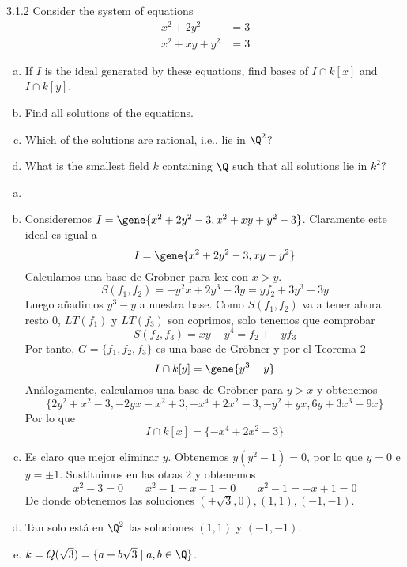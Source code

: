 \documentclass[twoside]{article}
\begin{document}
\begin{ejercicio}{3.1.2}
Consider the system of equations
\begin{align*}
x^2+2y^2&=3\\
x^2+xy+y^2&=3
\end{align*}
\begin{enumerate}[a.]
\item If $I$ is the ideal generated by these equations, find bases of $I ∩ k[x]$ and $I ∩ k[y]$.
\item Find all solutions of the equations.
\item Which of the solutions are rational, i.e., lie in $\Q^2$?
\item What is the smallest field $k$ containing $\Q$ such that all solutions lie in $k^2$?
\end{enumerate}
\end{ejercicio}
\begin{solucion}
\begin{enumerate}[a.]
\item[]
\item Consideremos $I=\gene{x^2+2y^2-3,x^2+xy+y^2-3}$. Claramente este ideal es igual a
$$
I=\gene{x^2+2y^2-3,xy-y^2}
$$
Calculamos una base de Gröbner para lex con $x>y$.
$$
S(f_1,f_2) = -y^2x + 2y^3-3y   = yf_2 + 3y^3-3y 
$$
Luego añadimos $y^3-y$ a nuestra base. Como $S(f_1,f_2)$ va a tener ahora resto 0, $LT(f_1)$ y $LT(f_3)$ son coprimos, solo tenemos que comprobar
$$
S(f_2,f_3) = xy - y^4 = f_2 + -yf_3
$$
Por tanto, $G=\{f_1,f_2,f_3\}$ es una base de Gröbner y por el Teorema 2 
$$I\cap k[y] = \gene{y^3-y}$$
Análogamente, calculamos una base de Gröbner para $y>x$ y obtenemos
$$
\{2y^2 + x^2 - 3, -2yx - x^2 + 3, -x^4 + 2x^2 - 3, -y^2 + yx, 6y +3x^3 - 9x\}
$$
Por lo que 
$$
I\cap k[x] = \{-x^4+2x^2-3\}
$$
\item Es claro que mejor eliminar $y$. Obtenemos $y(y^2-1)=0$, por lo que $y=0$ e $y=\pm 1$. Sustituimos en las otras 2 y obtenemos
$$
x^2 - 3 = 0 \qquad x^2-1 = x-1 = 0 \qquad x^2 -1 = -x +1 = 0
$$
De donde obtenemos las soluciones $(\pm \sqrt{3},0),(1,1),(-1,-1)$.
\item Tan solo está en $\Q^2$ las soluciones $(1,1)$ y $(-1,-1)$.
\item $k=Q(\sqrt{3}) = \{a+b\sqrt{3}\mid a,b\in \Q\}$.
\end{enumerate}
\end{solucion}


\newpage
\end{document}
